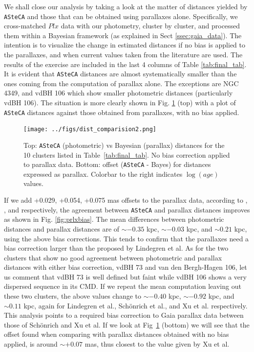 \documentclass[draft]{aa}
\begin{document}
We shall close our analysis by taking a look at the matter of distances yielded
by \texttt{ASteCA} and those that can be obtained using parallaxes alone.
Specifically, we cross-matched $Plx$ data with our photometry, cluster by
cluster, and processed them within a Bayesian framework (as explained in Sect
\ref{ssec:gaia_data}). The intention is to visualize the change in estimated
distances if no bias is applied to the parallaxes, and when current values
taken from the literature are used. The results of the exercise are included in
the last 4 columns of Table  \ref{tab:final_tab}. It is evident that 
\texttt{ASteCA} distances are almost systematically smaller than the ones
coming from the computation of parallax alone. The exceptions are NGC 4349, and
vdBH 106 which show smaller photometric distances (particularly vdBH 106). The
situation is more clearly shown in Fig. \ref{fig:prlxnobias}  (top) with a plot
of \texttt{ASteCA} distances against those obtained from parallaxes, with no
bias applied.

\begin{figure}[ht]
    \centering
    \texttt{[image: ../figs/dist\_comparision2.png]}
    \caption{Top: \texttt{ASteCA} (photometric) vs Bayesian (parallax)
    distances for the 10 clusters listed in Table~\ref{tab:final_tab}. No bias
    correction applied to parallax data.
    Bottom: offset (\texttt{ASteCA} - Bayes) for distances expressed
    as parallax. Colorbar to the right indicates $\log(age)$ values.}
    \label{fig:prlxnobias}
\end{figure}

If we add +0.029, +0.054, +0.075 mas offsets to the parallax data, according to
\cite{Lindegren_2018}, \cite{Schonrich2019}, and \cite{Xu_2019} respectively,
the agreement between \texttt{ASteCA} and parallax distances improves as shown
in Fig. \ref{fig:prlxbias}.
%
The mean differences between photometric distances and parallax distances are
of $\sim-0.35$ kpc, $\sim-0.03$ kpc, and $\sim0.21$ kpc, using the above bias
corrections. This tends to confirm that the parallaxes need a bias correction
larger than the proposed by Lindegren et al.
%
As for the two clusters that show no good agreement between photometric and
parallax distances with either bias correction, vdBH 73 and van den Bergh-Hagen
106, let us comment that vdBH 73 is well defined but faint while vdBH 106 shows
a very dispersed sequence in its CMD.
%
If we repeat the mean computation leaving out these two clusters, the above
values change to $\sim-0.40$ kpc, $\sim-0.92$ kpc, and $\sim0.11$ kpc, again
for Lindegren et al., Sch\"onrich et al., and Xu et al. respectively. This
analysis points to a required bias correction to Gaia parallax data between
those of Sch\"onrich and Xu et al. If we look at Fig~\ref{fig:prlxnobias} 
(bottom) we will see that the offset found when comparing with parallax
distances obtained with no bias applied, is around $\sim+0.07$ mas, thus
closest to the value given by Xu et al.
\end{document}
